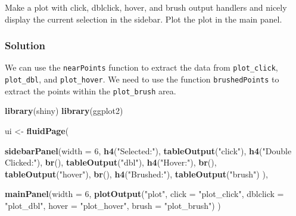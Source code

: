 \documentclass[]{book}
\newenvironment{Shaded}{\begin{snugshade}}{\end{snugshade}}
\newcommand{\DataTypeTok}[1]{\textcolor[rgb]{0.13,0.29,0.53}{#1}}
\newcommand{\DecValTok}[1]{\textcolor[rgb]{0.00,0.00,0.81}{#1}}
\newcommand{\KeywordTok}[1]{\textcolor[rgb]{0.13,0.29,0.53}{\textbf{#1}}}
\newcommand{\NormalTok}[1]{#1}
\newcommand{\StringTok}[1]{\textcolor[rgb]{0.31,0.60,0.02}{#1}}
\begin{document}
Make a plot with click, dblclick, hover, and brush output handlers and nicely display the current selection in the sidebar. Plot the plot in the main panel.

\begin{solution}

\hypertarget{solution-1}{%
\subsubsection*{Solution}\label{solution-1}}

We can use the \texttt{nearPoints} function to extract the data from \texttt{plot\_click}, \texttt{plot\_dbl}, and \texttt{plot\_hover}. We need to use the function \texttt{brushedPoints} to extract the points within the \texttt{plot\_brush} area.

\begin{Shaded}
\begin{Highlighting}[]
\KeywordTok{library}\NormalTok{(shiny)}
\KeywordTok{library}\NormalTok{(ggplot2)}

\NormalTok{ui <-}\StringTok{ }\KeywordTok{fluidPage}\NormalTok{(}

    \KeywordTok{sidebarPanel}\NormalTok{(}\DataTypeTok{width =} \DecValTok{6}\NormalTok{,}
        \KeywordTok{h4}\NormalTok{(}\StringTok{"Selected:"}\NormalTok{),}
        \KeywordTok{tableOutput}\NormalTok{(}\StringTok{"click"}\NormalTok{),}
        \KeywordTok{h4}\NormalTok{(}\StringTok{"Double Clicked:"}\NormalTok{),}
        \KeywordTok{br}\NormalTok{(),}
        \KeywordTok{tableOutput}\NormalTok{(}\StringTok{"dbl"}\NormalTok{),}
        \KeywordTok{h4}\NormalTok{(}\StringTok{"Hover:"}\NormalTok{),}
        \KeywordTok{br}\NormalTok{(),}
        \KeywordTok{tableOutput}\NormalTok{(}\StringTok{"hover"}\NormalTok{),}
        \KeywordTok{br}\NormalTok{(),}
        \KeywordTok{h4}\NormalTok{(}\StringTok{"Brushed:"}\NormalTok{),}
        \KeywordTok{tableOutput}\NormalTok{(}\StringTok{"brush"}\NormalTok{)}
\NormalTok{    ),}

    \KeywordTok{mainPanel}\NormalTok{(}\DataTypeTok{width =} \DecValTok{6}\NormalTok{,}
      \KeywordTok{plotOutput}\NormalTok{(}\StringTok{"plot"}\NormalTok{, }
                 \DataTypeTok{click =} \StringTok{"plot_click"}\NormalTok{, }
                 \DataTypeTok{dblclick =} \StringTok{"plot_dbl"}\NormalTok{,}
                 \DataTypeTok{hover =} \StringTok{"plot_hover"}\NormalTok{, }
                 \DataTypeTok{brush =} \StringTok{"plot_brush"}\NormalTok{)}
\NormalTok{    )}


\end{Highlighting}
\end{Shaded}
\end{solution}
\end{document}
